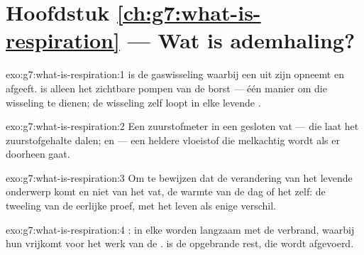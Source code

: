 \section*{Hoofdstuk \ref{ch:g7:what-is-respiration} --- Wat is ademhaling?}

\begin{solution}{exo:g7:what-is-respiration:1}
 is de gaswisseling waarbij een   uit zijn
 opneemt en  afgeeft.  is alleen het
zichtbare pompen van de borst --- één manier om die wisseling te dienen;
de wisseling zelf loopt in elke levende .
\end{solution}

\begin{solution}{exo:g7:what-is-respiration:2}
Een zuurstofmeter in een gesloten vat --- die laat het zuurstofgehalte
dalen; en  --- een heldere vloeistof die melkachtig wordt als er
 doorheen gaat.
\end{solution}

\begin{solution}{exo:g7:what-is-respiration:3}
Om te bewijzen dat de verandering van het levende onderwerp komt en niet
van het vat, de warmte van de dag of het  zelf: de tweeling van
de eerlijke proef, met het leven als enige verschil.
\end{solution}

\begin{solution}{exo:g7:what-is-respiration:4}
: in elke  worden  langzaam met de 
verbrand, waarbij hun  vrijkomt voor het werk van de .
 is de opgebrande rest, die wordt afgevoerd.
\end{solution}

